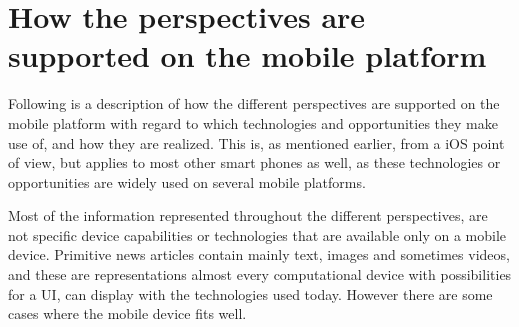 \section{How the perspectives are supported on the mobile platform}

Following is a description of how the different perspectives are supported on the mobile platform with regard to which technologies and opportunities they make use of, and how they are realized. This is, as mentioned earlier, from a iOS point of view, but applies to most other smart phones as well, as these technologies or opportunities are widely used on several mobile platforms.

Most of the information represented throughout the different perspectives, are not specific device capabilities or technologies that are available only on a mobile device. Primitive news articles contain mainly text, images and sometimes videos, and these are representations almost every computational device with possibilities for a UI, can display with the technologies used today. However there are some cases where the mobile device fits well.




